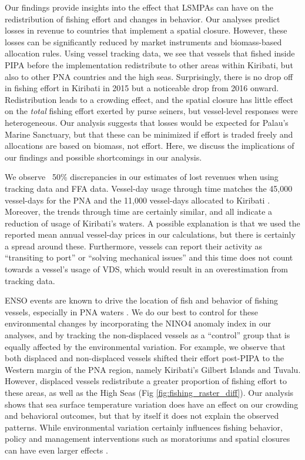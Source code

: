\documentclass[12pt]{article}
\begin{document}
Our findings provide insights into the effect that LSMPAs can have on the redistribution of fishing effort and changes in behavior. Our analyses predict losses in revenue to countries that implement a spatial closure. However, these losses can be significantly reduced by market instruments and biomass-based allocation rules. Using vessel tracking data, we see that vessels that fished inside PIPA before the implementation redistribute to other areas within Kiribati, but also to other PNA countries and the high seas. Surprisingly, there is no drop off in fishing effort in Kiribati in 2015 but a noticeable drop from 2016 onward. Redistribution leads to a crowding effect, and the spatial closure has little effect on the \emph{total} fishing effort exerted by purse seiners, but vessel-level responses were heterogeneous. Our analysis suggests that losses would be expected for Palau's Marine Sanctuary, but that these can be minimized if effort is traded freely and allocations are based on biomass, not effort. Here, we discuss the implications of our findings and possible shortcomings in our analysis.

We observe ~50\% discrepancies in our estimates of lost revenues when using tracking data and FFA data. Vessel-day usage through time matches the 45,000 vessel-days for the PNA and the 11,000 vessel-days allocated to Kiribati \cite{yeeting2018stabilising}. Moreover, the trends through time are certainly similar, and all indicate a reduction of usage of Kiribati's waters. A possible explanation is that we used the reported mean annual vessel-day prices in our calculations, but there is certainly a spread around these. Furthermore, vessels can report their activity as ``transiting to port'' or ``solving mechanical issues'' and this time does not count towards a vessel's usage of VDS, which would result in an overestimation from tracking data.

ENSO events are known to drive the location of fish and behavior of fishing vessels, especially in PNA waters \cite{lehodey_1997,kroodsma_2018,aqorau_2018}. We do our best to control for these environmental changes by incorporating the NINO4 anomaly index in our analyses, and by tracking the non-displaced vessels as a ``control'' group that is equally affected by the environmental variation. For example, we observe that both displaced and non-displaced vessels shifted their effort post-PIPA to the Western margin of the PNA region, namely Kiribati's Gilbert Islands and Tuvalu. However, displaced vessels redistribute a greater proportion of fishing effort to these areas, as well as the High Seas (Fig \ref{fig:fishing_raster_diff}). Our analysis shows that sea surface temperature variation does have an effect on our crowding and behavioral outcomes, but that by itself it does not explain the observed patterns. While environmental variation certainly influences fishing behavior, policy and management interventions such as moratoriums and spatial closures can have even larger effects \cite{kroodsma_2018}.
\end{document}
